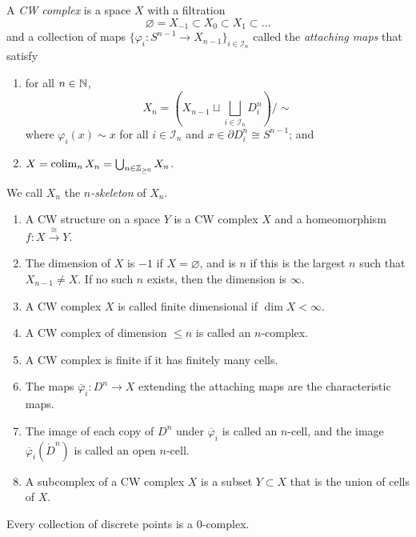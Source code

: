 \begin{definition}[CW complex]
  A \emph{CW complex} is a space $X$ with a filtration
  \[\varnothing = X_{-1} \subset X_0 \subset X_1 \subset \ldots\]
  and a collection of maps $\{\varphi_i: S^{n-1} \to X_{n-1}\}_{i \in \mathcal I_n}$ called the \emph{attaching maps} that satisfy
  \begin{enumerate}
    \item for all $n \in \mathbb{N}$, \[
            X_n = \left(X_{n-1} \sqcup \bigsqcup_{i \in \mathcal I_n} D_i^n\right)/{\sim}
          \]
          where $\varphi_i(x) \sim x$ for all $i \in \mathcal I_n$ and $x \in \partial D^n_i \cong S^{n-1}$; and
    \item $X = \operatorname{colim}_n X_n = \bigcup_{n \in \mathbb{Z}_{\geq 0}} X_n$.
  \end{enumerate}
  We call $X_n$ the \emph{$n$-skeleton} of $X_n$.
\end{definition}

\begin{definition}
  \hspace{0em}
  \begin{enumerate}
    \item A CW structure on a space $Y$ is a CW complex $X$ and a homeomorphism $f: X \xrightarrow{\cong} Y$.
    \item The dimension of $X$ is $-1$ if $X = \varnothing$, and is $n$ if this is the largest $n$ such that $X_{n-1} \neq X$. If no such $n$ exists, then the dimension is $\infty$.
    \item A CW complex $X$ is called finite dimensional if $\dim X < \infty$.
    \item A CW complex of dimension $\leq n$ is called an $n$-complex.
    \item A CW complex is finite if it has finitely many cells.
    \item The maps $\overline\varphi_i: D^n \to X$ extending the attaching maps are the characteristic maps.
    \item The image of each copy of $D^n$ under $\overline\varphi_i$ is called an $n$-cell, and the image $\overline\varphi_i(\mathring D^n)$ is called an open $n$-cell.
    \item A subcomplex of a CW complex $X$ is a subset $Y \subset X$ that is the union of cells of $X$.
  \end{enumerate}
\end{definition}

\begin{example}[$0$-complexes]
  Every collection of discrete points is a $0$-complex.
\end{example}

